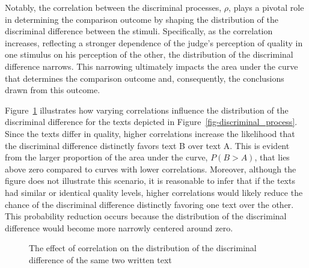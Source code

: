 \documentclass[
  authoryear,
  preprint,
  1p]{elsarticle}
\begin{document}
Notably, the correlation between the discriminal processes, \(\rho\),
plays a pivotal role in determining the comparison outcome by shaping
the distribution of the discriminal difference between the stimuli.
Specifically, as the correlation increases, reflecting a stronger
dependence of the judge's perception of quality in one stimulus on his
perception of the other, the distribution of the discriminal difference
narrows. This narrowing ultimately impacts the area under the curve that
determines the comparison outcome and, consequently, the conclusions
drawn from this outcome.

Figure~\ref{fig-correlation} illustrates how varying correlations
influence the distribution of the discriminal difference for the texts
depicted in Figure~\ref{fig-discriminal_process}. Since the texts differ
in quality, higher correlations increase the likelihood that the
discriminal difference distinctly favors text B over text A. This is
evident from the larger proportion of the area under the curve,
\(P(B > A)\), that lies above zero compared to curves with lower
correlations. Moreover, although the figure does not illustrate this
scenario, it is reasonable to infer that if the texts had similar or
identical quality levels, higher correlations would likely reduce the
chance of the discriminal difference distinctly favoring one text over
the other. This probability reduction occurs because the distribution of
the discriminal difference would become more narrowly centered around
zero.

\begin{figure}


\caption{\label{fig-correlation}The effect of correlation on the
distribution of the discriminal difference of the same two written text}

\end{figure}%
\end{document}
